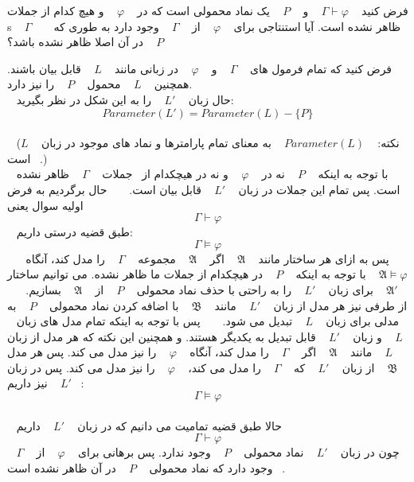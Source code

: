 فرض کنید 
  $\Gamma\vdash\varphi$
  و 
  $P$
  یک نماد محمولی است که در
  $\varphi$
  و هیچ کدام از جملات s
  $\Gamma$
  ظاهر نشده است. آیا استنتاجی برای 
  $\varphi$
  از 
  $\Gamma$
  وجود دارد به طوری که 
  $P$
  در آن اصلا ظاهر نشده باشد؟
\begin{ans}
  فرض کنید که تمام فرمول های 
  $\Gamma$
  و
  $\varphi$
  در زبانی مانند 
  $L$
  قابل بیان باشند. همچنین 
  $L$
  محمول
  $P$
  را نیز دارد. 
  \\
  حال زبان 
  $L'$
  را به این شکل در نظر بگیرید: 
  \[Parameter(L') = Parameter(L) - \{P\} \]
  \\
  (نکته: 
  $Parameter(L)$
  به معنای تمام پارامترها و نماد های موجود در زبان 
  $L$
  است.)
  \\
  با توجه به اینکه
  $P$
  نه در 
  $\varphi$
  و نه در هیچکدام از  جملات 
  $\Gamma$
  ظاهر نشده است. پس تمام این جملات در زبان 
  $L'$
  قابل بیان است.
  
  حال برگردیم به فرض اولیه سوال یعنی 
  \[\Gamma\vdash\varphi\]
  طبق قضیه درستی داریم:
  \[\Gamma\models\varphi\]
  پس به ازای هر ساختار مانند 
  $\mathfrak{A}$
  اگر 
  $\mathfrak{A}$
  مجموعه 
  $\Gamma$
  را مدل کند، آنگاه 
  $\mathfrak{A}\models\varphi$
  با توجه به اینکه 
  $P$
  در هیچکدام از جملات ما ظاهر نشده. می توانیم ساختار 
  $\mathfrak{A}'$
  برای زبان 
  $L'$
  را به راحتی با حذف نماد محمولی 
  $P$
  از 
  $\mathfrak{A}$
  بسازیم.
  
  از طرفی نیز هر مدل از زبان 
  $L'$
  مانند 
  $\mathfrak{B}$
  با اضافه کردن نماد محمولی 
  $P$
  به مدلی برای زبان 
  $L$
  تبدیل می شود. 
  
  پس با توجه به اینکه تمام مدل های زبان 
  $L$
  و زبان 
  $L'$
  قابل تبدیل به یکدیگر هستند. و همچنین این نکته که هر مدل از زبان 
  $L$
  مانند 
  $\mathfrak{A}$
  اگر 
  $\Gamma$
  را مدل کند، آنگاه 
  $\varphi$
  را نیز مدل می کند. پس هر مدل 
  $\mathfrak{B}$
  از زبان 
  $L'$
  که 
  $\Gamma$
  را مدل می کند، 
  $\varphi$
  را نیز مدل می کند. پس در زبان 
  $L'$
  نیز داریم: 
  \[\Gamma\models\varphi\]
  \\
  حالا طبق قضیه تمامیت می دانیم که در زبان 
  $L'$
  داریم
  \[\Gamma\vdash\varphi\]
  چون در زبان 
  $L'$
  نماد محمولی 
  $P$
  وجود ندارد. پس برهانی برای 
  $\varphi$
  از 
  $\Gamma$
  وجود دارد که نماد محمولی 
  $P$
  در آن ظاهر نشده است.
\end{ans}
